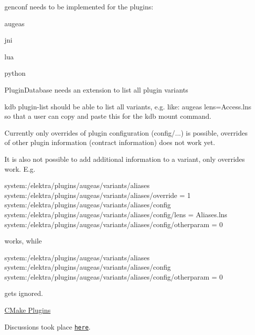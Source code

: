 \begin{DoxyItemize}
\item {\ttfamily genconf} needs to be implemented for the plugins\+:
\begin{DoxyItemize}
\item augeas
\item jni
\item lua
\item python
\end{DoxyItemize}
\item {\ttfamily Plugin\+Database} needs an extension to list all plugin variants
\item {\ttfamily kdb plugin-\/list} should be able to list all variants, e.\+g. like\+: {\ttfamily augeas lens=Access.\+lns} so that a user can copy and paste this for the {\ttfamily kdb mount} command.
\end{DoxyItemize}

Currently only overrides of plugin configuration ({\ttfamily config/...}) is possible, overrides of other plugin information (contract information) does not work yet.

It is also not possible to add additional information to a variant, only overrides work. E.\+g.


\begin{DoxyCode}
system:/elektra/plugins/augeas/variants/aliases
system:/elektra/plugins/augeas/variants/aliases/override = 1
system:/elektra/plugins/augeas/variants/aliases/config
system:/elektra/plugins/augeas/variants/aliases/config/lens = Aliases.lns
system:/elektra/plugins/augeas/variants/aliases/config/otherparam = 0
\end{DoxyCode}


works, while


\begin{DoxyCode}
system:/elektra/plugins/augeas/variants/aliases
system:/elektra/plugins/augeas/variants/aliases/config
system:/elektra/plugins/augeas/variants/aliases/config/otherparam = 0
\end{DoxyCode}


gets ignored.


\begin{DoxyItemize}
\item \hyperlink{doc_decisions_cmake_plugins_md}{C\+Make Plugins}
\end{DoxyItemize}

Discussions took place \href{https://git.libelektra.org/issues/1006}{\tt here}. 